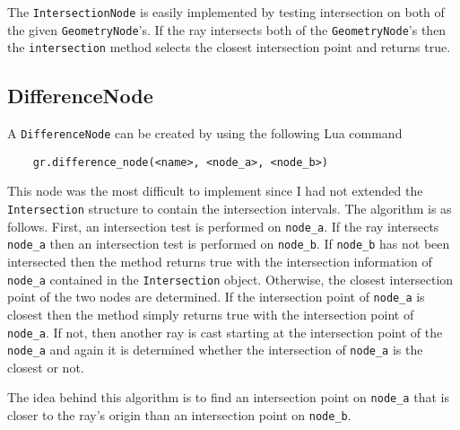 The \verb|IntersectionNode| is easily implemented by testing intersection on
both of the given \verb|GeometryNode|'s. If the ray intersects both of the
\verb|GeometryNode|'s then the \verb|intersection| method selects the closest
intersection point and returns true.

\subsection*{DifferenceNode}
A \verb|DifferenceNode| can be created by using the following Lua command
\begin{lstlisting}
    gr.difference_node(<name>, <node_a>, <node_b>)
\end{lstlisting}

This node was the most difficult to implement since I had not extended the
\verb|Intersection| structure to contain the intersection intervals. The
algorithm is as follows. First, an intersection test is performed on 
\verb|node_a|. If the ray intersects \verb|node_a| then an intersection test is
performed on \verb|node_b|. If \verb|node_b| has not been intersected then the
method returns true with the intersection information of \verb|node_a| contained
in the \verb|Intersection| object. Otherwise, the closest intersection point of 
the two nodes are determined. If the intersection point of \verb|node_a| is 
closest then the method simply returns true with the intersection point of 
\verb|node_a|. If not, then another ray is cast starting at the intersection
point of the \verb|node_a| and again it is determined whether the intersection
of \verb|node_a| is the closest or not.

The idea behind this algorithm is to find an intersection point on \verb|node_a|
that is closer to the ray's origin than an intersection point on \verb|node_b|.

